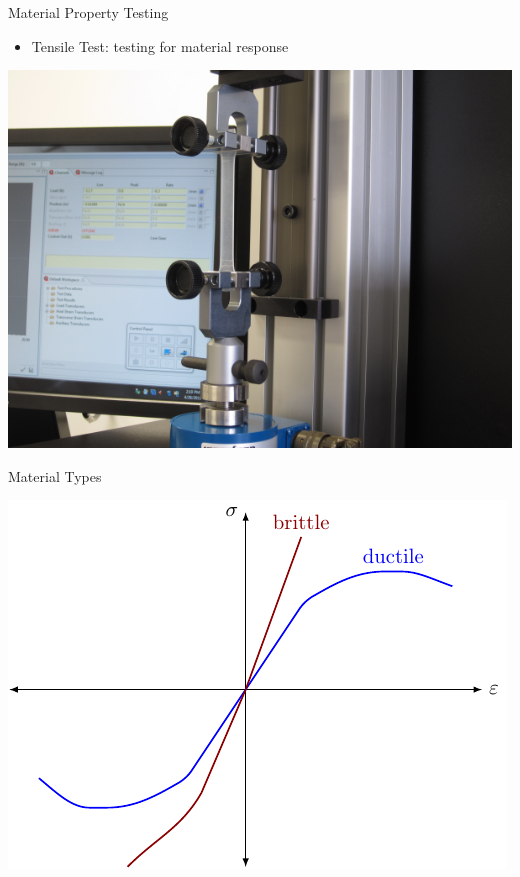 \documentclass[10pt, svgnames]{beamer}
\begin{document}
\begin{frame}[label={sec:org7ca4627}]{Material Property Testing}
\begin{itemize}
\item Tensile Test: testing for material response
\end{itemize}

\begin{center}
\includegraphics[height=0.6\textheight]{./pictures/tensile-test-with-quattro.png}
\end{center}
\end{frame}

\begin{frame}[label={sec:orgc4c54be}]{Material Types}
\begin{center}
\includegraphics[height=0.6\textheight]{pictures/material-type-behavior.pdf}
\end{center}
\end{frame}
\end{document}
